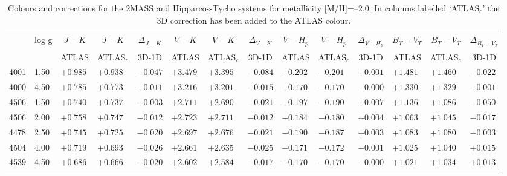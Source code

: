 \documentclass[]{aa}
\def\teff{$T\rm_{eff}$}
\begin{document}
\begin{appendix}
\begin{table*}
\caption{\label{2masshipm20}
Colours and corrections for the 2MASS and Hipparcos-Tycho systems for metallicity [M/H]=--2.0. In columns labelled `ATLAS$_c$' the 3D correction
has been added to the ATLAS colour. }
\renewcommand{\tabcolsep}{3pt}
\tabskip=0pt
\begin{center}
\begin{tabular}{llllllllllllll}
\hline\noalign{\smallskip}
\multicolumn{1}{c}{\teff} & 
\multicolumn{1}{c}{log g} & 
\multicolumn{1}{c}{$J-K$} &
\multicolumn{1}{c}{$J-K$} &
\multicolumn{1}{c}{$\Delta_{J-K}$} &
\multicolumn{1}{c}{$V-K$} &
\multicolumn{1}{c}{$V-K$} &
\multicolumn{1}{c}{$\Delta_{V-K}$} &
\multicolumn{1}{c}{$V-H_p$} &
\multicolumn{1}{c}{$V-H_p$} &
\multicolumn{1}{c}{$\Delta_{V-H_p}$} &
\multicolumn{1}{c}{$B_T-V_T$} &
\multicolumn{1}{c}{$B_T-V_T$} &
\multicolumn{1}{c}{$\Delta_{B_T-V_T}$} \\
\multicolumn{2}{c}{ } &  
\multicolumn{1}{c}{ATLAS} &
\multicolumn{1}{c}{ATLAS$_c$}&
\multicolumn{1}{c}{3D-1D}&
\multicolumn{1}{c}{ATLAS} &
\multicolumn{1}{c}{ATLAS$_c$}&
\multicolumn{1}{c}{3D-1D}&
\multicolumn{1}{c}{ATLAS} &
\multicolumn{1}{c}{ATLAS$_c$}&
\multicolumn{1}{c}{3D-1D}&
\multicolumn{1}{c}{ATLAS} &
\multicolumn{1}{c}{ATLAS$_c$}&
\multicolumn{1}{c}{3D-1D} \\
\hline\noalign{\smallskip}
\hline\noalign{\smallskip}
4001  &1.50 & $+0.985$ &$ +0.938$ &$ -0.047$ &$ +3.479$ &$ +3.395$ &$ -0.084$ &$ -0.202$ &$ -0.201$ &$ +0.001$ &$ +1.481$ &$ +1.460$ &$ -0.022$\\
4000  &4.50 & $+0.785$ &$ +0.773$ &$ -0.011$ &$ +3.216$ &$ +3.201$ &$ -0.015$ &$ -0.170$ &$ -0.170$ &$ -0.000$ &$ +1.330$ &$ +1.329$ &$ -0.001$\\
4506  &1.50 & $+0.740$ &$ +0.737$ &$ -0.003$ &$ +2.711$ &$ +2.690$ &$ -0.021$ &$ -0.197$ &$ -0.190$ &$ +0.007$ &$ +1.136$ &$ +1.086$ &$ -0.050$\\
4506  &2.00 & $+0.758$ &$ +0.747$ &$ -0.012$ &$ +2.723$ &$ +2.711$ &$ -0.012$ &$ -0.184$ &$ -0.180$ &$ +0.004$ &$ +1.063$ &$ +1.045$ &$ -0.017$\\
4478  &2.50 & $+0.745$ &$ +0.725$ &$ -0.020$ &$ +2.697$ &$ +2.676$ &$ -0.021$ &$ -0.190$ &$ -0.187$ &$ +0.003$ &$ +1.083$ &$ +1.080$ &$ -0.003$\\
4504  &4.00 & $+0.719$ &$ +0.693$ &$ -0.026$ &$ +2.661$ &$ +2.635$ &$ -0.025$ &$ -0.171$ &$ -0.172$ &$ -0.001$ &$ +1.025$ &$ +1.040$ &$ +0.015$\\
4539  &4.50 & $+0.686$ &$ +0.666$ &$ -0.020$ &$ +2.602$ &$ +2.584$ &$ -0.017$ &$ -0.170$ &$ -0.170$ &$ -0.000$ &$ +1.021$ &$ +1.034$ &$ +0.013$\\

\end{tabular}
\end{center}
\end{table*}
\end{appendix}
\end{document}
